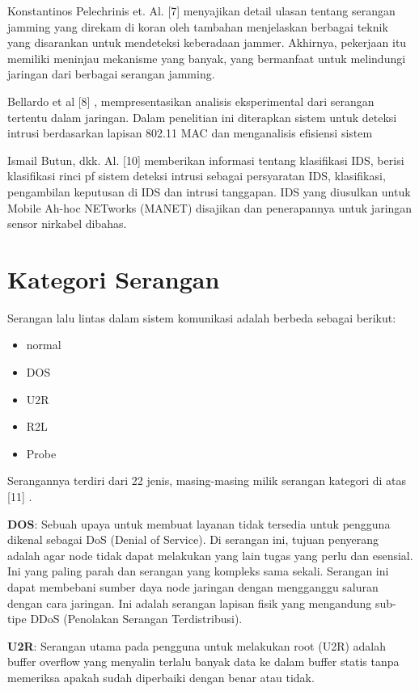 \documentclass[conference]{IEEEtran}
\begin{document}
    Konstantinos Pelechrinis et. Al. [7] \cite{pelechrinis2010denial} menyajikan detail ulasan tentang serangan jamming yang direkam di koran oleh tambahan menjelaskan berbagai teknik yang disarankan untuk mendeteksi keberadaan jammer. Akhirnya, pekerjaan itu memiliki meninjau mekanisme yang banyak, yang bermanfaat untuk melindungi jaringan dari berbagai serangan jamming.
    
    Bellardo et al [8] \cite{bellardo2003802}, mempresentasikan analisis eksperimental dari serangan tertentu dalam jaringan. Dalam penelitian ini diterapkan sistem untuk deteksi intrusi berdasarkan lapisan 802.11 MAC dan menganalisis efisiensi sistem
    
    Ismail Butun, dkk. Al. [10]\cite{zhang2000intrusion} memberikan informasi tentang klasifikasi IDS, berisi klasifikasi rinci pf sistem deteksi intrusi sebagai persyaratan IDS, klasifikasi, pengambilan keputusan di IDS dan intrusi tanggapan. IDS yang diusulkan untuk Mobile Ah-hoc NETworks (MANET) disajikan dan penerapannya untuk jaringan sensor nirkabel dibahas.
    
\section{Kategori Serangan}
Serangan lalu lintas dalam sistem komunikasi adalah
berbeda sebagai berikut:

\begin{itemize}
    \item normal
    \item DOS
    \item U2R
    \item R2L
    \item Probe
\end{itemize}

Serangannya terdiri dari 22 jenis, masing-masing milik serangan
kategori di atas [11] \cite{butun2013survey}.

\textbf{DOS}: Sebuah upaya untuk membuat layanan
tidak tersedia untuk pengguna dikenal sebagai DoS (Denial of Service). Di
serangan ini, tujuan penyerang adalah agar node tidak dapat melakukan yang lain
tugas yang perlu dan esensial. Ini yang paling parah dan
serangan yang kompleks sama sekali. Serangan ini dapat membebani sumber daya
node jaringan dengan mengganggu saluran dengan cara jaringan.
Ini adalah serangan lapisan fisik yang mengandung sub-tipe DDoS
(Penolakan Serangan Terdistribusi).

\textbf{U2R}: Serangan utama pada pengguna untuk melakukan root
(U2R) adalah buffer overflow yang menyalin terlalu banyak data ke dalam
buffer statis tanpa memeriksa apakah sudah diperbaiki dengan benar atau tidak.
\end{document}
